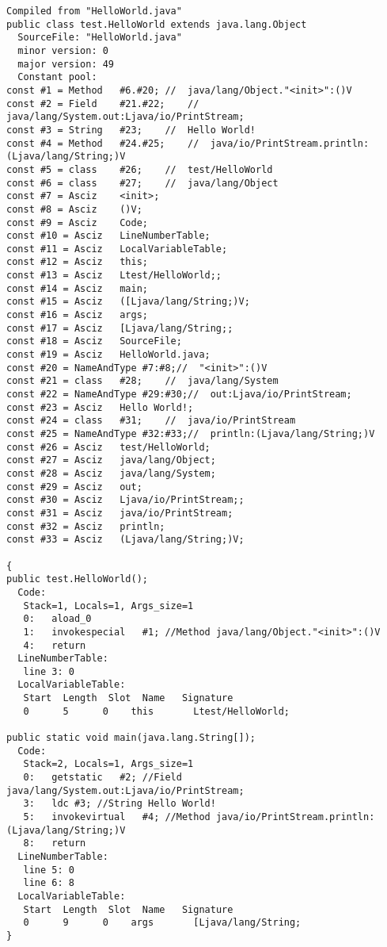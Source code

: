 \begin{framed}
\begin{verbatim}
Compiled from "HelloWorld.java"
public class test.HelloWorld extends java.lang.Object
  SourceFile: "HelloWorld.java"
  minor version: 0
  major version: 49
  Constant pool:
const #1 = Method   #6.#20; //  java/lang/Object."<init>":()V
const #2 = Field    #21.#22;    //  java/lang/System.out:Ljava/io/PrintStream;
const #3 = String   #23;    //  Hello World!
const #4 = Method   #24.#25;    //  java/io/PrintStream.println:(Ljava/lang/String;)V
const #5 = class    #26;    //  test/HelloWorld
const #6 = class    #27;    //  java/lang/Object
const #7 = Asciz    <init>;
const #8 = Asciz    ()V;
const #9 = Asciz    Code;
const #10 = Asciz   LineNumberTable;
const #11 = Asciz   LocalVariableTable;
const #12 = Asciz   this;
const #13 = Asciz   Ltest/HelloWorld;;
const #14 = Asciz   main;
const #15 = Asciz   ([Ljava/lang/String;)V;
const #16 = Asciz   args;
const #17 = Asciz   [Ljava/lang/String;;
const #18 = Asciz   SourceFile;
const #19 = Asciz   HelloWorld.java;
const #20 = NameAndType #7:#8;//  "<init>":()V
const #21 = class   #28;    //  java/lang/System
const #22 = NameAndType #29:#30;//  out:Ljava/io/PrintStream;
const #23 = Asciz   Hello World!;
const #24 = class   #31;    //  java/io/PrintStream
const #25 = NameAndType #32:#33;//  println:(Ljava/lang/String;)V
const #26 = Asciz   test/HelloWorld;
const #27 = Asciz   java/lang/Object;
const #28 = Asciz   java/lang/System;
const #29 = Asciz   out;
const #30 = Asciz   Ljava/io/PrintStream;;
const #31 = Asciz   java/io/PrintStream;
const #32 = Asciz   println;
const #33 = Asciz   (Ljava/lang/String;)V;

{
public test.HelloWorld();
  Code:
   Stack=1, Locals=1, Args_size=1
   0:   aload_0
   1:   invokespecial   #1; //Method java/lang/Object."<init>":()V
   4:   return
  LineNumberTable:
   line 3: 0
  LocalVariableTable:
   Start  Length  Slot  Name   Signature
   0      5      0    this       Ltest/HelloWorld;

public static void main(java.lang.String[]);
  Code:
   Stack=2, Locals=1, Args_size=1
   0:   getstatic   #2; //Field java/lang/System.out:Ljava/io/PrintStream;
   3:   ldc #3; //String Hello World!
   5:   invokevirtual   #4; //Method java/io/PrintStream.println:(Ljava/lang/String;)V
   8:   return
  LineNumberTable:
   line 5: 0
   line 6: 8
  LocalVariableTable:
   Start  Length  Slot  Name   Signature
   0      9      0    args       [Ljava/lang/String;
}
\end{verbatim}
\end{framed}

